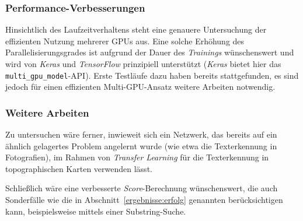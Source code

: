 \subsubsection{Performance-Verbesserungen}

Hinsichtlich des Laufzeitverhaltens steht eine genauere Untersuchung der effizienten Nutzung mehrerer GPUs aus. Eine
solche Erhöhung des Parallelisierungsgrades ist aufgrund der Dauer des \textit{Trainings} wünschenswert und wird von
\textit{Keras} und \textit{TensorFlow} prinzipiell unterstützt (\textit{Keras} bietet hier das
\texttt{multi\_gpu\_model}-API). Erste Testläufe dazu haben bereits stattgefunden, es sind jedoch für einen effizienten
Multi-GPU-Ansatz weitere Arbeiten notwendig.

\subsubsection{Weitere Arbeiten}

Zu untersuchen wäre ferner, inwieweit sich ein Netzwerk, das bereits auf ein ähnlich gelagertes Problem angelernt
wurde (wie etwa die Texterkennung in Fotografien), im Rahmen von \textit{Transfer Learning} für die Texterkennung in
topographischen Karten verwenden lässt.

Schließlich wäre eine verbesserte \textit{Score}-Berechnung wünschenswert, die auch Sonderfälle wie die in
Abschnitt~\ref{ergebnisse:erfolg} genannten berücksichtigen kann, beispielsweise mittels einer Substring-Suche.

